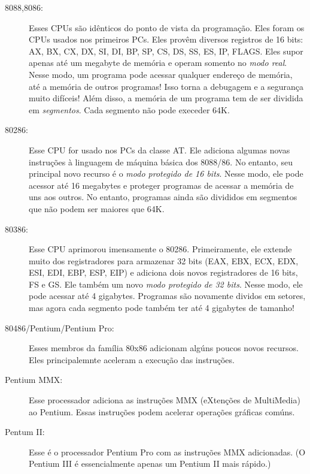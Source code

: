 \begin{description}

\item[8088,8086:] Esses CPUs são idênticos do ponto de vista da programação. 
Eles foram os CPUs usados nos primeiros PCs. Eles provêm diversos registros de 
16 bits: AX, BX, CX, DX, SI, DI, BP, SP, CS, DS, SS, ES, IP, FLAGS. Eles 
supor apenas até um megabyte de memória e operam somento no \emph{modo real}. 
Nesse modo, um programa pode acessar qualquer endereço de memória, até a 
memória de outros programas! Isso torna a debugagem e a segurança muito 
difíceis! Além disso, a memória de um programa tem de ser dividida em 
\emph{segmentos}. Cada segmento não pode execeder 64K.

\item[80286:] Esse CPU for usado nos PCs da classe AT. Ele adiciona algumas 
novas instruções à linguagem de máquina básica dos 8088/86. No entanto, seu 
principal novo recurso é o \emph{modo protegido de 16 bits}. Nesse modo, 
ele pode acessor até 16 megabytes e proteger programas de acessar a memória de 
uns aos outros. No entanto, programas ainda são divididos em segmentos que 
não podem ser maiores que 64K.

\item[80386:] Esse CPU aprimorou imensamente o 80286. Primeiramente, ele 
extende muito dos registradores para armazenar 32 bits (EAX, EBX, ECX, EDX, 
ESI, EDI, EBP, ESP, EIP) e adiciona dois novos registradores de 16 bits, FS e 
GS. Ele também um novo \emph{modo protegido de 32 bits}. Nesse modo, ele pode 
acessar até 4 gigabytes. Programas são novamente dividos em setores, mas 
agora cada segmento pode também ter até 4 gigabytes de tamanho!

\item[80486/Pentium/Pentium Pro:] Esses membros da família 80x86 adicionam 
algúns poucos novos recursos. Eles principalemnte aceleram a execução das 
instruções.


\item[Pentium MMX:] Esse processador adiciona as instruções MMX (eXtenções de 
MultiMedia) ao Pentium. Essas instruções podem acelerar operações gráficas 
comúns.

\item[Pentum II:] Esse é o processador Pentium Pro com as instruções MMX 
adicionadas. (O Pentium III é essencialmente apenas um Pentium II mais rápido.)

\end{description}

